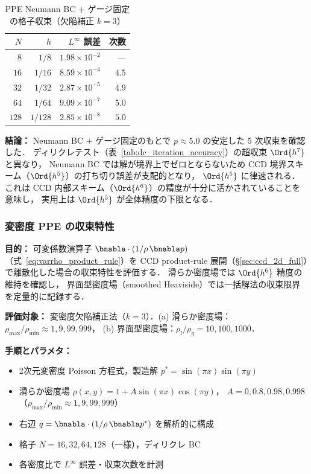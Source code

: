 \begin{table}[htbp]
\centering
\caption{PPE Neumann BC + ゲージ固定の格子収束（欠陥補正 $k=3$）}
\label{tab:ppe_neumann}
\renewcommand{\arraystretch}{1.3}
\begin{tabular}{rrrr}
\toprule
$N$ & $h$ & $L^\infty$ 誤差 & 次数 \\
\midrule
$8$   & $1/8$   & $1.98 \times 10^{-2}$ & ---  \\
$16$  & $1/16$  & $8.59 \times 10^{-4}$ & $4.5$ \\
$32$  & $1/32$  & $2.87 \times 10^{-5}$ & $4.9$ \\
$64$  & $1/64$  & $9.09 \times 10^{-7}$ & $5.0$ \\
$128$ & $1/128$ & $2.85 \times 10^{-8}$ & $5.0$ \\
\bottomrule
\end{tabular}
\end{table}

\noindent\textbf{結論：}
Neumann BC + ゲージ固定のもとで $p \approx 5.0$ の安定した 5 次収束を確認した．
ディリクレテスト（表~\ref{tab:dc_iteration_accuracy}）の超収束 $\Ord{h^7}$ と異なり，
Neumann BC では解が境界上でゼロとならないため
CCD 境界スキーム（$\Ord{h^5}$）の打ち切り誤差が支配的となり，
$\Ord{h^5}$ に律速される．
これは CCD 内部スキーム（$\Ord{h^6}$）の精度が十分に活かされていることを意味し，
実用上は $\Ord{h^5}$ が全体精度の下限となる．

\subsubsection{変密度 PPE の収束特性}
\label{sec:verify_ppe_varrho}

\noindent\textbf{目的：}
可変係数演算子 $\bnabla\cdot(1/\rho\,\bnabla p)$（式~\eqref{eq:varrho_product_rule}）を
CCD product-rule 展開（§\ref{sec:ccd_2d_full}）で離散化した場合の収束特性を評価する．
滑らか密度場では $\Ord{h^6}$ 精度の維持を確認し，
界面型密度場（smoothed Heaviside）では一括解法の収束限界を定量的に記録する．

\noindent\textbf{評価対象：}
変密度欠陥補正法（$k=3$）．(a) 滑らか密度場：$\rho_{\max}/\rho_{\min} \approx 1, 9, 99, 999$，
(b) 界面型密度場：$\rho_l/\rho_g = 10, 100, 1000$．

\noindent\textbf{手順とパラメタ：}
\begin{itemize}[noitemsep]
  \item 2次元変密度 Poisson 方程式，製造解 $p^* = \sin(\pi x)\sin(\pi y)$
  \item 滑らか密度場 $\rho(x,y) = 1 + A\sin(\pi x)\cos(\pi y)$，
        $A = 0, 0.8, 0.98, 0.998$
        （$\rho_{\max}/\rho_{\min} \approx 1, 9, 99, 999$）
  \item 右辺 $q = \bnabla\cdot(1/\rho\,\bnabla p^*)$ を解析的に構成
  \item 格子 $N = 16, 32, 64, 128$（一様），ディリクレ BC
  \item 各密度比で $L^\infty$ 誤差・収束次数を計測
\end{itemize}

